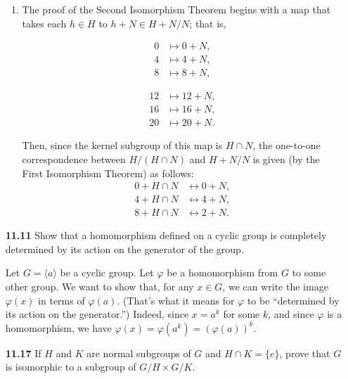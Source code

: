 \documentclass[12pt,reqno]{amsart}
\newcommand{\<}{\ensuremath{\langle}}
\renewcommand{\>}{\ensuremath{\rangle}}
\begin{document}
\begin{enumerate}
\begin{enumerate}
 \item
The proof of the Second Isomorphism Theorem begins with a map that takes each 
$h\in H$ to $h+N \in H+N/N$; that is,%
\begin{multicols}{2}
\begin{align*}
0 &\mapsto 0 + N,\\  
4 &\mapsto 4 + N,\\  
8 &\mapsto 8 + N,
\end{align*}

\begin{align*}
12 &\mapsto 12 + N,\\  
16 &\mapsto 16 + N,\\  
20 &\mapsto 20 + N.
\end{align*}
\end{multicols}
\noindent Then, since the kernel subgroup of this map is 
$H\cap N$, the one-to-one correspondence between $H/(H \cap N)$ and
$H+N/N$ is given (by the First Isomorphism Theorem) as follows:
\begin{align*}
0+H\cap N &\longleftrightarrow 0 + N,\\  
4+H\cap N &\longleftrightarrow 4 + N,\\  
8+H\cap N &\longleftrightarrow 2 + N.
\end{align*}

\end{enumerate}

\newpage

\item[{\bf 11.11}]
Show that a homomorphism defined on a cyclic group is completely
determined by its action on the generator of the group.

\medskip

Let $G = \<a\>$ be a cyclic group. Let $\varphi$ be a homomorphism from $G$ to
some other group.  We want to show that, for any $x\in G$, we can write the
image $\varphi(x)$ in terms of $\varphi(a)$.  (That's what it means for $\varphi$
to be ``determined by its action on the generator.'')
Indeed, since $x = a^k$ for some $k$, and since $\varphi$ is a homomorphism, we
have $\varphi(x) = \varphi(a^k) = (\varphi(a))^k$.

\bigskip

\item[{\bf 11.17}]
If $H$ and $K$ are normal subgroups of $G$ and $H \cap K = \{ e \}$,
prove that $G$ is isomorphic to a subgroup of $G/H \times G/K$.

\medskip


\end{enumerate}
\end{document}
